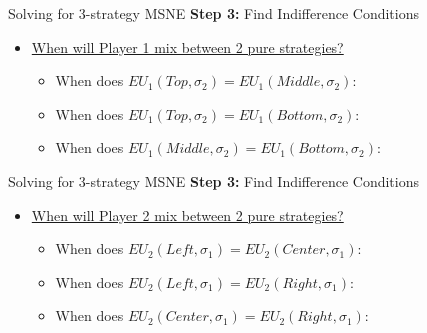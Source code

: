 \begin{frame}{Solving for 3-strategy MSNE}
  \textbf{Step 3:} Find Indifference Conditions
  \begin{itemize}

    \item \underline{When will Player 1 mix between 2 pure strategies?} 
    \begin{itemize}
      \item When does $EU_1(Top, \sigma_2) = EU_1(Middle, \sigma_2)$:
      \vspace{14mm}
      \item When does $EU_1(Top, \sigma_2) = EU_1(Bottom, \sigma_2)$:
      \vspace{14mm}
      \item When does $EU_1(Middle, \sigma_2) = EU_1(Bottom, \sigma_2)$:
      \vspace{14mm}
      
    \end{itemize}
    
  \end{itemize}
  
\end{frame}


\begin{frame}{Solving for 3-strategy MSNE}
  \textbf{Step 3:} Find Indifference Conditions
  \begin{itemize}

    \item \underline{When will Player 2 mix between 2 pure strategies?} 
    \begin{itemize}
      \item When does $EU_2(Left, \sigma_1) = EU_2(Center, \sigma_1)$:
      \vspace{14mm}
      \item When does $EU_2(Left, \sigma_1) = EU_2(Right, \sigma_1)$:
      \vspace{14mm}
      \item When does $EU_2(Center, \sigma_1) = EU_2(Right, \sigma_1)$:
      \vspace{14mm}
      
    \end{itemize}
    
  \end{itemize}
  
\end{frame}

